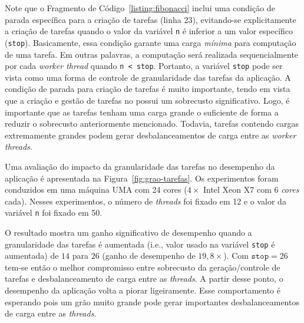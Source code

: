 \documentclass{SBCbookchapter}
\begin{document}
	Note que o Fragmento de Código~\ref{listing:fibonacci} inclui uma
	condição de parada específica para a criação de tarefas (linha 23),
	evitando-se explicitamente a criação de tarefas quando o valor da
	variável \texttt{n} é inferior a um valor específico
	(\texttt{stop}).  Basicamente, essa condição garante uma carga
	\textit{mínima} para computação de uma tarefa. Em outras palavras, a
	computação será realizada sequencialmente por cada \textit{worker
	thread} quando \texttt{n < stop}. Portanto, a variável \texttt{stop}
	pode ser vista como uma forma de controle de granularidade das
	tarefas da aplicação.  A condição de parada para criação de tarefas
	é muito importante, tendo em vista que a criação e gestão de tarefas
	no \openmp possui um sobrecusto significativo. Logo, é importante
	que as tarefas tenham uma carga grande o suficiente de forma a
	reduzir o sobrecusto anteriormente mencionado. Todavia, tarefas
	contendo cargas extremamente grandes podem gerar desbalanceamentos
	de carga entre as \textit{worker threads}.

	Uma avaliação do impacto da granularidade das tarefas no desempenho
	da aplicação é apresentada na Figura~\ref{fig:grao-tarefas}. Os
	experimentos foram conduzidos em uma máquina UMA com 24 cores ($4
	\times$ Intel Xeon X7 com 6 \textit{cores} cada). Nesses
	experimentos, o número de \textit{threads} foi fixado em 12 e o
	valor da variável \texttt{n} foi fixado em 50.
	
	O resultado mostra um ganho significativo de desempenho quando a
	granularidade das tarefas é aumentada (i.e., valor usado na variável
	\texttt{stop} é aumentada) de $14$ para $26$ (ganho de desempenho de
	$19,8\times$).  Com $\texttt{stop} = 26$ tem-se então o melhor
	compromisso entre sobrecusto da geração/controle de tarefas e
	desbalanceamento de carga entre as \textit{threads}. A partir desse
	ponto, o desempenho da aplicação volta a piorar ligeiramente. Esse
	comportamento é esperando pois um grão muito grande pode gerar
	importantes desbalanceamentos de carga entre as \textit{threads}.
	
\end{document}
